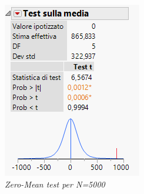 \begin{figure}[H]
	\centering
	\includegraphics{img/hw0/test5000.png}
	\caption{\textit{Zero-Mean test per N=5000}}
\end{figure}

